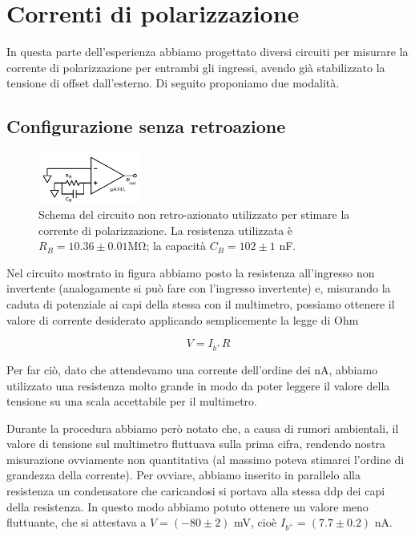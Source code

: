 \section{Correnti di polarizzazione}

In questa parte dell'esperienza abbiamo progettato diversi circuiti per misurare la corrente di polarizzazione per entrambi gli ingressi, avendo già stabilizzato la tensione di offset dall'esterno. Di seguito proponiamo due modalità.

\subsection{Configurazione senza retroazione}

\begin{figure}
  \begin{center}
    \includegraphics[width=0.30\textwidth]{../E02/latex/direct_measure.pdf}
  \end{center}
  \caption{Schema del circuito non retro-azionato utilizzato per stimare la corrente di polarizzazione. La resistenza utilizzata è $R_B=10.36\pm0.01$\si{\mega\ohm}; la capacità $C_B=102 \pm 1$ \si{\nano\farad}.}
  \label{circuito:rel2_correnti_senzaretroazione}
\end{figure}

Nel circuito mostrato in figura abbiamo posto la resistenza all'ingresso non invertente (analogamente si può fare con l'ingresso invertente) e, misurando la caduta di potenziale ai capi della stessa con il multimetro, possiamo ottenere il valore di corrente desiderato applicando semplicemente la legge di Ohm

$$V=I_{b^+} R$$

Per far ciò, dato che attendevamo una corrente dell'ordine dei \si{\nano\ampere}, abbiamo utilizzato una resistenza molto grande in modo da poter leggere il valore della tensione su una scala accettabile per il multimetro.

Durante la procedura abbiamo però notato che, a causa di rumori ambientali, il valore di tensione sul multimetro fluttuava sulla prima cifra, rendendo nostra misurazione ovviamente non quantitativa (al massimo poteva stimarci l'ordine di grandezza della corrente). Per ovviare, abbiamo inserito in parallelo alla resistenza un condensatore che caricandosi si portava alla stessa ddp dei capi della resistenza. In questo modo abbiamo potuto ottenere un valore meno fluttuante, che si attestava a $V=(-80 \pm 2)$ \si{\milli\volt}, cioè $I_{b^+}=(7.7 \pm 0.2)$ \si{\nano\ampere}.

